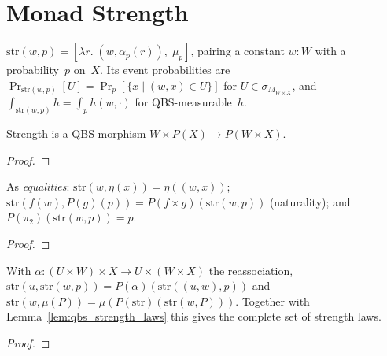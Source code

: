 \section{Monad Strength}\label{sec:strength}

\begin{definition}\label{def:strength}
  \rocqok
  $\mathrm{str}(w, p) = [\lambda r.\; (w, \alpha_p(r)),\; \mu_p]$,
  pairing a constant $w : W$ with a probability~$p$ on~$X$.
  Its event probabilities are $\Pr_{\mathrm{str}(w,p)}[U] =
  \Pr_p[\{x \mid (w,x) \in U\}]$ for $U \in \sigma_{M_{W \times X}}$,
  and $\int_{\mathrm{str}(w,p)} h = \int_p h(w, \cdot)$ for QBS-measurable~$h$.
\end{definition}

\begin{lemma}\label{lem:qbs_morphism_strength}
  \rocqok
  Strength is a QBS morphism $W \times P(X) \to P(W \times X)$.
\end{lemma}
\begin{proof}\rocqok\end{proof}

\begin{lemma}\label{lem:qbs_strength_laws}
  \rocqok
  As \emph{equalities}:
  $\mathrm{str}(w, \eta(x)) = \eta((w, x))$;
  $\mathrm{str}(f(w), P(g)(p)) = P(f \times g)(\mathrm{str}(w, p))$
  (naturality); and $P(\pi_2)(\mathrm{str}(w, p)) = p$.
\end{lemma}
\begin{proof}\rocqok\end{proof}

\begin{lemma}\label{lem:qbs_strength_assoc_join}
  \rocqok
  With $\alpha : (U \times W) \times X \to U \times (W \times X)$ the reassociation, $\mathrm{str}(u, \mathrm{str}(w, p)) = P(\alpha)(\mathrm{str}((u,w), p))$ and $\mathrm{str}(w, \mu(P)) = \mu(P(\mathrm{str})(\mathrm{str}(w, P)))$. Together with Lemma~\ref{lem:qbs_strength_laws} this gives the complete set of strength laws.
\end{lemma}
\begin{proof}\rocqok\end{proof}


